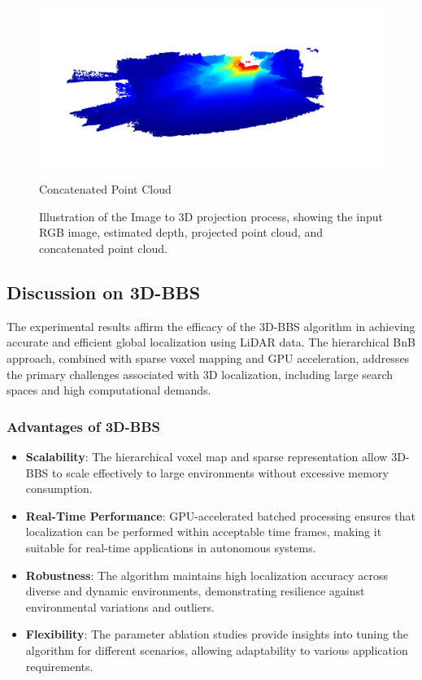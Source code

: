 \begin{figure}[t]
\begin{minipage}{0.49\textwidth}
        \vspace{1em}
        \includegraphics[width=\textwidth]{figures/concatenated_point_cloud.png}
        \caption{Concatenated Point Cloud}
        \label{fig:concatenated_point_cloud}
    \end{minipage}

    \caption{Illustration of the Image to 3D projection process, showing the input RGB image, estimated depth, projected point cloud, and concatenated point cloud.}
    \label{fig:image_to_3d_projection}
\end{figure}

\subsection{Discussion on 3D-BBS}
The experimental results affirm the efficacy of the 3D-BBS algorithm in achieving accurate and efficient global localization using LiDAR data. The hierarchical BnB approach, combined with sparse voxel mapping and GPU acceleration, addresses the primary challenges associated with 3D localization, including large search spaces and high computational demands.

\subsubsection{Advantages of 3D-BBS}
\begin{itemize}
    \item \textbf{Scalability}: The hierarchical voxel map and sparse representation allow 3D-BBS to scale effectively to large environments without excessive memory consumption.
    \item \textbf{Real-Time Performance}: GPU-accelerated batched processing ensures that localization can be performed within acceptable time frames, making it suitable for real-time applications in autonomous systems.
    \item \textbf{Robustness}: The algorithm maintains high localization accuracy across diverse and dynamic environments, demonstrating resilience against environmental variations and outliers.
    \item \textbf{Flexibility}: The parameter ablation studies provide insights into tuning the algorithm for different scenarios, allowing adaptability to various application requirements.
\end{itemize}

